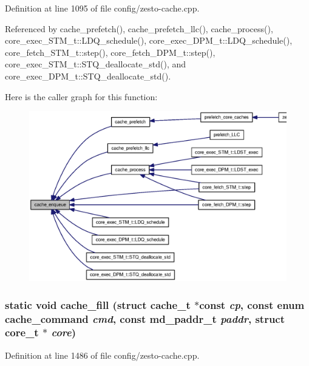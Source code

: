 Definition at line 1095 of file config/zesto-cache.cpp.

Referenced by cache\_\-prefetch(), cache\_\-prefetch\_\-llc(), cache\_\-process(), core\_\-exec\_\-STM\_\-t::LDQ\_\-schedule(), core\_\-exec\_\-DPM\_\-t::LDQ\_\-schedule(), core\_\-fetch\_\-STM\_\-t::step(), core\_\-fetch\_\-DPM\_\-t::step(), core\_\-exec\_\-STM\_\-t::STQ\_\-deallocate\_\-std(), and core\_\-exec\_\-DPM\_\-t::STQ\_\-deallocate\_\-std().

Here is the caller graph for this function:\nopagebreak
\begin{figure}[H]
\begin{center}
\leavevmode
\includegraphics[width=420pt]{config_2zesto-cache_8cpp_0831369c0f015a2e350b71f2fc445c70_icgraph}
\end{center}
\end{figure}
\subsubsection[{cache\_\-fill}]{\setlength{\rightskip}{0pt plus 5cm}static void cache\_\-fill (struct {\bf cache\_\-t} $\ast$const  {\em cp}, \/  const enum {\bf cache\_\-command} {\em cmd}, \/  const {\bf md\_\-paddr\_\-t} {\em paddr}, \/  struct {\bf core\_\-t} $\ast$ {\em core})\hspace{0.3cm}{\tt  [inline, static]}}\label{config_2zesto-cache_8cpp_4268c8076eb193fe97abe55263b81c9c}




Definition at line 1486 of file config/zesto-cache.cpp.

